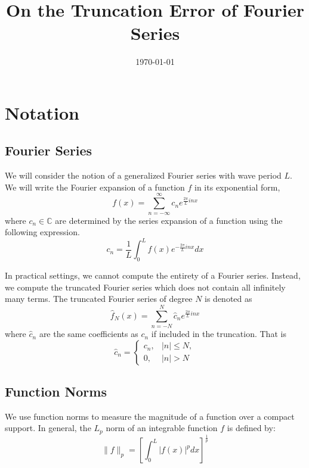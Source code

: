 \documentclass{article}
\title{On the Truncation Error of Fourier Series}
\date{\today}
\begin{document}
\setlength{\parindent}{0pt}
\maketitle

\section{Notation}

\subsection{Fourier Series}

We will consider the notion of a generalized Fourier series with wave period $L$. We will write the Fourier expansion of a function $f$ in its exponential form,
\begin{equation}
    f(x) = \sum_{n=-\infty}^{\infty} c_n e^{\frac{2\pi}{L}inx}
\end{equation}
where $c_{n} \in \mathbb{C}$ are determined by the series expansion of a function using the following expression.
\begin{equation}
    c_n = \frac{1}{L} \int_{0}^{L} f(x) e^{-\frac{2\pi}{L}inx} dx
\end{equation}

In practical settings, we cannot compute the entirety of a Fourier series. Instead, we compute the truncated Fourier series which does not contain all infinitely many terms. The truncated Fourier series of degree $N$ is denoted as
\begin{equation}
    \hat{f}_N(x) = \sum_{n=-N}^{N} \hat{c}_n e^{\frac{2\pi}{L}inx}
\end{equation}
where $\hat{c}_n$ are the same coefficients as $c_n$ if included in the truncation. That is
\begin{equation}
    \hat{c}_n =
    \begin{cases}
        c_n, &|n| \leq N, \\
        0, &|n| > N
    \end{cases}
\end{equation}

\subsection{Function Norms}

We use function norms to measure the magnitude of a function over a compact support. In general, the $L_p$ norm of an integrable function $f$ is defined by:
\begin{equation}
    \lVert f \rVert_p = \left[\int_{0}^{L} |f(x)|^p dx \right]^{\frac{1}{p}}
\end{equation}
\end{document}
